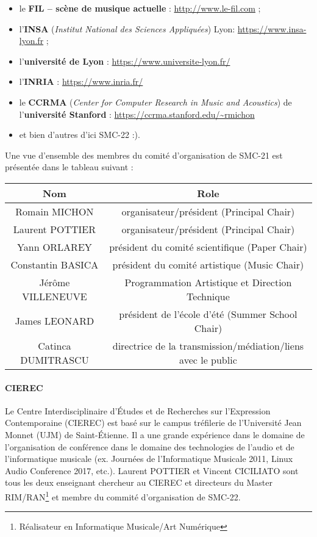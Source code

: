 \documentclass[fontsize=12pt]{scrartcl} %
\numberwithin{equation}{section} %
\numberwithin{figure}{section} %
\numberwithin{table}{section} %
\begin{document}
\begin{itemize}
\item le \textbf{FIL -- scène de musique actuelle} : \url{http://www.le-fil.com} ;
\item l'\textbf{INSA} (\textit{Institut National des Sciences Appliquées}) Lyon: \url{https://www.insa-lyon.fr} ;
\item l'\textbf{université de Lyon} : \url{https://www.universite-lyon.fr/}
\item l'\textbf{INRIA} : \url{https://www.inria.fr/}
\item le \textbf{CCRMA} (\textit{Center for Computer Research in Music and Acoustics}) de l'\textbf{université Stanford} : \url{https://ccrma.stanford.edu/~rmichon}
\item et bien d'autres d'ici SMC-22 :).
\end{itemize}

Une vue d'ensemble des membres du comité d'organisation de SMC-21 est présentée dans le tableau suivant :

\begin{table}[!htbp]
  \begin{center}
    \begin{tabular}{c | c}
      \textbf{Nom} & \textbf{Role} \\
      \hline
      \hline
      Romain MICHON & organisateur/président (Principal Chair) \\
      Laurent POTTIER & organisateur/président (Principal Chair) \\
      Yann ORLAREY & président du comité scientifique (Paper Chair) \\
      Constantin BASICA & président du comité artistique (Music Chair) \\
      Jérôme VILLENEUVE & Programmation Artistique et Direction Technique \\
      James LEONARD & président de l'école d'été (Summer School Chair) \\
      Catinca DUMITRASCU & directrice de la transmission/médiation/liens avec le public \\
    \end{tabular}
  \end{center}
\end{table}

\paragraph{\textbf{CIEREC}} Le Centre Interdisciplinaire d'Études et de Recherches sur l'Expression Contemporaine (CIEREC) est basé sur le campus tréfilerie de l'Université Jean Monnet (UJM) de Saint-Étienne. Il a une grande expérience dans le domaine de l'organisation de conférence dans le domaine des technologies de l'audio et de l'informatique musicale (ex. Journées de l'Informatique Musicale 2011, Linux Audio Conference 2017, etc.). Laurent POTTIER et Vincent CICILIATO sont tous les deux enseignant chercheur au CIEREC et directeurs du Master RIM/RAN\footnote{Réalisateur en Informatique Musicale/Art Numérique} et membre du commité d'organisation de SMC-22. 
\end{document}
